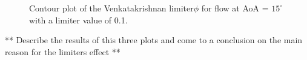 \begin{figure}[]
  \begin{subfigmatrix}{2}
    \label{fig:contour_G0}
    \label{fig:contour_G1}
  \end{subfigmatrix}
  \begin{subfigmatrix}{1}
    \label{fig:contour_G2}
  \end{subfigmatrix}
  
  \caption{Contour plot of the Venkatakrishnan limiter$\phi$ for flow at AoA = $15^\circ$ with a limiter value of 0.1. }
  \label{fig:limiter_contour}
\end{figure}

** Describe the results of this three plots and come to a conclusion on the main reason for the limiters effect **

